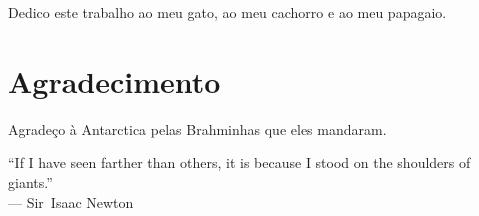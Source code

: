 


%
%

\begin{dedicatoria}
Dedico este trabalho ao meu gato, ao meu cachorro e ao meu papagaio.
\end{dedicatoria}

%
%
%

\chapter*{Agradecimento}
\noindent Agradeço à Antarctica pelas Brahminhas que eles mandaram.

%
%
\begin{epigrafe}
``If I have seen farther than others, it is because I stood on the shoulders of giants.''\\
--- Sir~Isaac Newton
\end{epigrafe}
